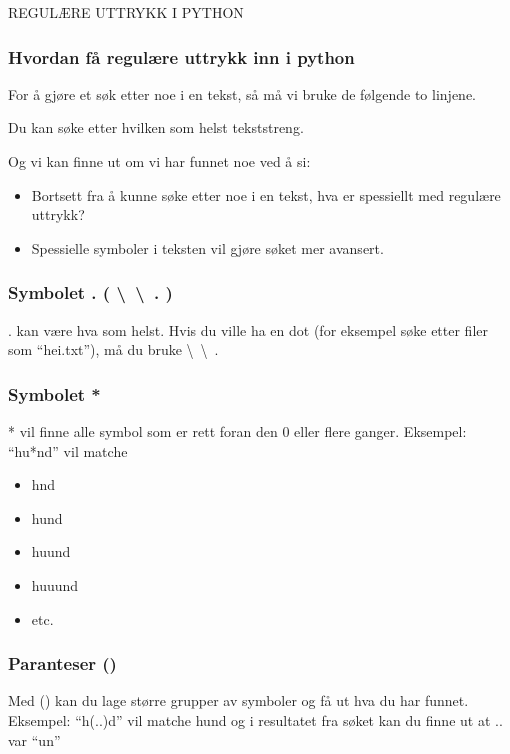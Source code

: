 \documentclass[onesided,norsk,11pt]{beamer}
\begin{document}
\begin{frame}
  REGULÆRE UTTRYKK I PYTHON
\end{frame}

\begin{frame}
  \frametitle{Hvordan få regulære uttrykk inn i python}
  For å gjøre et søk etter noe i en tekst, så må vi bruke
  de følgende to linjene.
  
\end{frame}

\begin{frame}
  Du kan søke etter hvilken som helst tekststreng.
  
\end{frame}

\begin{frame}
  Og vi kan finne ut om vi har funnet noe ved å si:
  
\end{frame}

\begin{frame}
  \begin{itemize}
    \item Bortsett fra å kunne søke etter noe i en tekst, 
      hva er spessiellt med regulære uttrykk?
    \item Spessielle symboler i teksten vil gjøre søket
      mer avansert.
  \end{itemize}
\end{frame}

\begin{frame}
  \frametitle{Symbolet . ( \textbackslash~\textbackslash~. )}
  . kan være hva som helst. Hvis du ville ha en dot (for eksempel
  søke etter filer som ``hei.txt''), må du bruke \textbackslash~\textbackslash~.
  
\end{frame}

\begin{frame}
  \frametitle{Symbolet *}
  * vil finne alle symbol som er rett foran den 0 eller flere ganger.
  Eksempel: ``hu*nd'' vil matche
  \begin{itemize}
    \item hnd
    \item hund
    \item huund
    \item huuund
    \item etc.
    \end{itemize}
\end{frame}

\begin{frame}
  \frametitle{Paranteser ()}
  Med () kan du lage større grupper av symboler og få ut hva
  du har funnet. 
  Eksempel: ``h(..)d''
  vil matche hund og i resultatet fra søket kan du finne ut at
  .. var ``un''
\end{frame}
\end{document}
